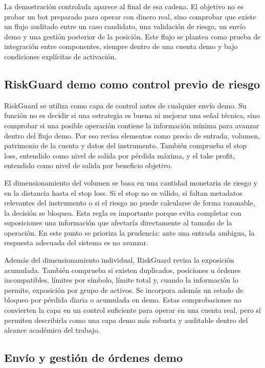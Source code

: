 La demostraci\'on controlada aparece al final de esa cadena. El objetivo no es
probar un bot preparado para operar con dinero real, sino comprobar que existe
un flujo auditado entre un caso candidato, una validaci\'on de riesgo, un env\'io
demo y una gesti\'on posterior de la posici\'on. Este flujo se plantea como prueba
de integraci\'on entre componentes, siempre dentro de una cuenta demo y bajo
condiciones expl\'icitas de activaci\'on.

\subsection{RiskGuard demo como control previo de riesgo}
\label{subsec:riskguard-limite-riesgo}

RiskGuard se utiliza como capa de control antes de cualquier env\'io demo. Su
funci\'on no es decidir si una estrategia es buena ni mejorar una se\~nal t\'ecnica,
sino comprobar si una posible operaci\'on contiene la informaci\'on m\'inima para
avanzar dentro del flujo demo. Por eso revisa elementos como precio de entrada,
volumen, patrimonio de la cuenta y datos del instrumento. Tambi\'en comprueba el
stop loss, entendido como nivel de salida por p\'erdida m\'axima, y el take profit,
entendido como nivel de salida por beneficio objetivo.

El dimensionamiento del volumen se basa en una cantidad monetaria de riesgo y
en la distancia hasta el stop loss. Si el stop no es v\'alido, si faltan metadatos
relevantes del instrumento o si el riesgo no puede calcularse de forma razonable,
la decisi\'on se bloquea. Esta regla es importante porque evita completar con
suposiciones una informaci\'on que afectar\'ia directamente al tama\~no de la
operaci\'on. En este punto se prioriza la prudencia: ante una entrada ambigua, la
respuesta adecuada del sistema es no avanzar.

Adem\'as del dimensionamiento individual, RiskGuard revisa la exposici\'on
acumulada. Tambi\'en comprueba si existen duplicados, posiciones u \'ordenes
incompatibles, l\'imites por s\'imbolo, l\'imite total y, cuando la informaci\'on lo
permite, exposici\'on por grupo de activos. Se incorpora adem\'as un estado de
bloqueo por p\'erdida diaria o acumulada en demo. Estas comprobaciones no
convierten la capa en un control suficiente para operar en una cuenta real, pero
s\'i permiten describirla como una capa demo m\'as robusta y auditable dentro del
alcance acad\'emico del trabajo.

\subsection{Env\'io y gesti\'on de \'ordenes demo}
\label{subsec:envio-gestion-ordenes-demo}


